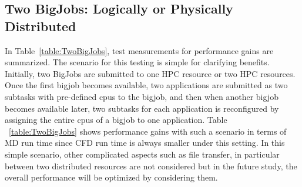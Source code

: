 \documentclass[conference,final]{IEEEtran}
\newcommand{\jhanote}[1]{ {\textcolor{red} { ***Jha: #1 }}}
\newcommand{\jhanote}[1]{}
\begin{document}
\subsection{Two BigJobs: Logically or Physically Distributed}


In Table~\ref{table:TwoBigJobs}, test measurements for performance
gains are summarized. The scenario for this testing is simple for
clarifying benefits. Initially, two BigJobs are submitted to one HPC
resource or two HPC resources. Once the first bigjob becomes
available, two applications are submitted as two subtasks with
pre-defined cpus to the bigjob, and then when another bigjob becomes
available later, two subtasks for each application is reconfigured by
assigning the entire cpus of a bigjob to one application. Table
~\ref{table:TwoBigJobs} shows performance gains with such a scenario
in terms of MD run time since CFD run time is always smaller under
this setting. In this simple scenario, other complicated aspects such
as file transfer, in particular between two distributed resources are
not considered but in the future study, the overall performance will
be optimized by considering them.

\end{document}
